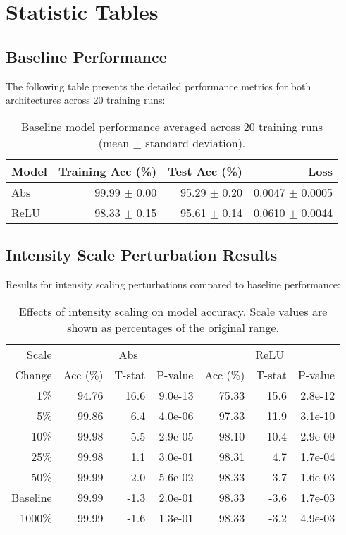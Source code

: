 \section{Statistic Tables}
\label{appendix:statistic_tables} 

\subsection{Baseline Performance}

The following table presents the detailed performance metrics for both architectures across 20 training runs:

\begin{table}[H]
\centering
\begin{tabular}{lrrr}
\hline
Model & Training Acc (\%) & Test Acc (\%) & Loss \\
\hline
Abs & 99.99 $\pm$ 0.00 & 95.29 $\pm$ 0.20 & 0.0047 $\pm$ 0.0005 \\
ReLU & 98.33 $\pm$ 0.15 & 95.61 $\pm$ 0.14 & 0.0610 $\pm$ 0.0044 \\
\hline
\end{tabular}
\caption{Baseline model performance averaged across 20 training runs (mean $\pm$ standard deviation).}
\label{tab:stat_baseline}
\end{table}

\subsection{Intensity Scale Perturbation Results}

Results for intensity scaling perturbations compared to baseline performance:

\begin{table}[H]
\centering
\begin{tabular}{r|rrr|rrr}
Scale & \multicolumn{3}{|c|}{Abs} & \multicolumn{3}{|c}{ReLU} \\
Change & Acc (\%) & T-stat & P-value & Acc (\%) & T-stat & P-value \\
\hline
1\% & 94.76 & 16.6 & 9.0e-13 & 75.33 & 15.6 & 2.8e-12 \\
5\% & 99.86 & 6.4 & 4.0e-06 & 97.33 & 11.9 & 3.1e-10 \\
10\% & 99.98 & 5.5 & 2.9e-05 & 98.10 & 10.4 & 2.9e-09 \\
25\% & 99.98 & 1.1 & 3.0e-01 & 98.31 & 4.7 & 1.7e-04 \\
50\% & 99.99 & -2.0 & 5.6e-02 & 98.33 & -3.7 & 1.6e-03 \\
Baseline & 99.99 & -1.3 & 2.0e-01 & 98.33 & -3.6 & 1.7e-03 \\
1000\% & 99.99 & -1.6 & 1.3e-01 & 98.33 & -3.2 & 4.9e-03 \\
\end{tabular}
\caption{Effects of intensity scaling on model accuracy. Scale values are shown as percentages of the original range.}
\label{tab:stat_scale}
\end{table}

